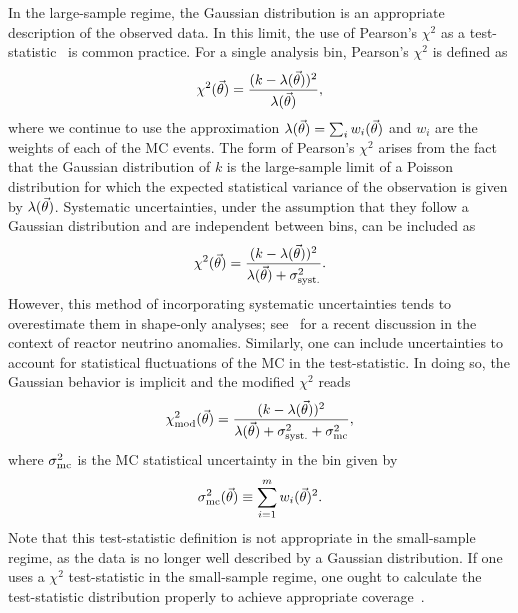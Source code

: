 In the large-sample regime, the Gaussian distribution is an appropriate description of the observed data. In this limit, the use of Pearson's $\chi^2$ as a test-statistic~\cite{Pearson:1900} is common practice. For a single analysis bin, Pearson's $\chi^2$ is defined as
\begin{equation}
\chi^2(\vec{\theta}) = \frac{(k - \lambda(\vec{\theta}))^2}{\lambda(\vec{\theta})},
\label{eq:chi2_pearson}
\end{equation}
where we continue to use the approximation $\lambda(\vec{\theta}) = \sum_i{w_i(\vec{\theta})}$ and $w_i$ are the weights of each of the MC events. The form of Pearson's $\chi^2$ arises from the fact that the Gaussian distribution of $k$ is the large-sample limit of a Poisson distribution for which the expected statistical variance of the observation is given by $\lambda(\vec{\theta})$. Systematic uncertainties, under the assumption that they follow a Gaussian distribution and are independent between bins, can be included as
\begin{equation}
\chi^2(\vec{\theta}) = \frac{(k - \lambda(\vec{\theta}))^2}{\lambda(\vec{\theta}) + \sigma^2_{\rm syst.}}.
\label{eq:chi2_systematics}
\end{equation}
However, this method of incorporating systematic uncertainties tends to overestimate them in shape-only analyses; see~\cite{Cogswell:2018auu} for a recent discussion in the context of reactor neutrino anomalies. Similarly, one can include uncertainties to account for statistical fluctuations of the MC in the test-statistic. In doing so, the Gaussian behavior is implicit and the modified $\chi^2$ reads
\begin{align}
\chi^2_{\rm mod}(\vec{\theta}) = \frac{(k - \lambda(\vec{\theta}))^2}{\lambda(\vec{\theta}) + \sigma^2_{\rm syst.} + \sigma^2_{\rm mc}},
\label{eq:modified_chi2}
\end{align}
where $\sigma^2_{\rm mc}$ is the MC statistical uncertainty in the bin given by
\begin{equation}\label{eq:sigma}
\sigma^2_{\rm mc}(\vec{\theta}) \equiv \sum_{i=1}^m w_i(\vec{\theta})^2.
\end{equation}
Note that this test-statistic definition is not appropriate in the small-sample regime, as the data is no longer well described by a Gaussian distribution. If one uses a $\chi^2$ test-statistic in the small-sample regime, one ought to calculate the test-statistic distribution properly to achieve appropriate coverage~\cite{cowan1998statistical}.


